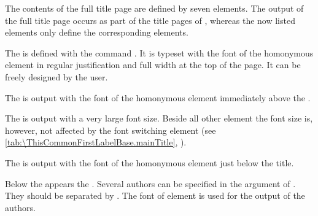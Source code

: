 \begin{Declaration}
\end{Declaration}%
The contents of the full title page are defined by seven elements. The output
of the full title page occurs as part of the title pages of
, whereas the now listed elements
only define the corresponding elements.

\BeginIndexGroup
{}%
The  is defined with the command
. It is typeset with the font of the homonymous element in
regular justification and full width at the top of the page. It can be freely
designed by the user.%
\EndIndexGroup

\BeginIndexGroup
{}%
The  is
output with the font of the homonymous element immediately above the
.%
\EndIndexGroup

\BeginIndexGroup
{}%
The  is output with a very large font
size.  Beside all other element the font size
is, however, not affected by the font switching element 
(see \autoref{tab:\ThisCommonFirstLabelBase.mainTitle},
).%
\EndIndexGroup

\BeginIndexGroup
{}%
The
 is output with the font of the homonymous element
just below the title.%
\EndIndexGroup

\BeginIndexGroup
{}%
Below the  appears the
.  Several authors can be specified in
the argument of . They should be separated by . The
font of element  is used for the output of the authors.%
\EndIndexGroup

